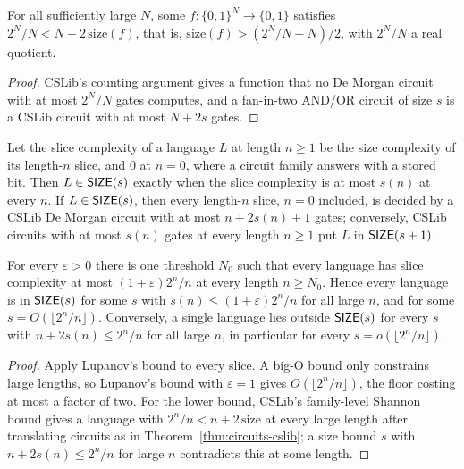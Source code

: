 \begin{theorem}
  \label{thm:lowerbounds-shannon-cslib}
  \leanok
  For all sufficiently large $N$, some $f : \{0,1\}^N \to \{0,1\}$ satisfies
  $2^N / N < N + 2\,\mathrm{size}(f)$, that is,
  $\mathrm{size}(f) > (2^N / N - N) / 2$, with $2^N / N$ a real quotient.
\end{theorem}
\begin{proof}
  \leanok
  CSLib's counting argument gives a function that no De Morgan circuit with at
  most $2^N / N$ gates computes, and a fan-in-two AND/OR circuit of size $s$ is
  a CSLib circuit with at most $N + 2s$ gates.
\end{proof}

\begin{theorem}
  \label{thm:lowerbounds-size-classes}
  \leanok
  Let the slice complexity of a language $L$ at length $n \ge 1$ be the size
  complexity of its length-$n$ slice, and $0$ at $n = 0$, where a circuit
  family answers with a stored bit. Then $L \in \mathsf{SIZE}(s)$ exactly when the
  slice complexity is at most $s(n)$ at every $n$. If $L \in \mathsf{SIZE}(s)$, then
  every length-$n$ slice, $n = 0$ included, is decided by a CSLib De Morgan
  circuit with at most $n + 2s(n) + 1$ gates; conversely, CSLib circuits with at
  most $s(n)$ gates at every length $n \ge 1$ put $L$ in $\mathsf{SIZE}(s + 1)$.

  For every $\varepsilon > 0$ there is one threshold $N_0$ such that every
  language has slice complexity at most $(1 + \varepsilon) 2^n / n$ at every
  length $n \ge N_0$. Hence every language is in $\mathsf{SIZE}(s)$ for some $s$
  with $s(n) \le (1 + \varepsilon) 2^n / n$ for all large $n$, and for some
  $s = O(\lfloor 2^n / n \rfloor)$. Conversely, a single language lies outside
  $\mathsf{SIZE}(s)$ for every $s$ with $n + 2s(n) \le 2^n / n$ for all large $n$,
  in particular for every $s = o(\lfloor 2^n / n \rfloor)$.
\end{theorem}
\begin{proof}
  \leanok
  Apply Lupanov's bound to every slice. A big-O bound only constrains large
  lengths, so Lupanov's bound with $\varepsilon = 1$ gives
  $O(\lfloor 2^n / n \rfloor)$, the floor costing at most a factor of two. For
  the lower bound,
  CSLib's family-level Shannon bound gives a language with
  $2^n / n < n + 2\,\mathrm{size}$ at every large length after translating
  circuits as in Theorem~\ref{thm:circuits-cslib}; a size bound $s$ with
  $n + 2s(n) \le 2^n / n$ for large $n$ contradicts this at some length.
\end{proof}

